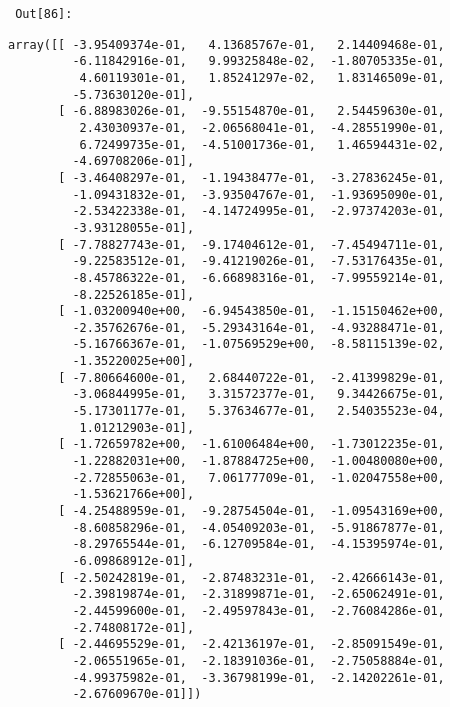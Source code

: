         {\par%
        \vspace{-1\smallerfontscale}%
        \noindent%
        \begin{minipage}{\cellleftmargin}%
    \hfill%
    {\smaller%
    \tt%
    \color{nbframe-out-prompt}%
    Out[86]:}%
    \hspace{\inputpadding}%
    \hspace{0em}%
    \hspace{3pt}%
    \end{minipage}%
        }%
    \begin{addmargin}[\cellleftmargin]{0em}%
    {\smaller%
    \vspace{-1\smallerfontscale}%
    
    
    
    \begin{verbatim}
array([[ -3.95409374e-01,   4.13685767e-01,   2.14409468e-01,
         -6.11842916e-01,   9.99325848e-02,  -1.80705335e-01,
          4.60119301e-01,   1.85241297e-02,   1.83146509e-01,
         -5.73630120e-01],
       [ -6.88983026e-01,  -9.55154870e-01,   2.54459630e-01,
          2.43030937e-01,  -2.06568041e-01,  -4.28551990e-01,
          6.72499735e-01,  -4.51001736e-01,   1.46594431e-02,
         -4.69708206e-01],
       [ -3.46408297e-01,  -1.19438477e-01,  -3.27836245e-01,
         -1.09431832e-01,  -3.93504767e-01,  -1.93695090e-01,
         -2.53422338e-01,  -4.14724995e-01,  -2.97374203e-01,
         -3.93128055e-01],
       [ -7.78827743e-01,  -9.17404612e-01,  -7.45494711e-01,
         -9.22583512e-01,  -9.41219026e-01,  -7.53176435e-01,
         -8.45786322e-01,  -6.66898316e-01,  -7.99559214e-01,
         -8.22526185e-01],
       [ -1.03200940e+00,  -6.94543850e-01,  -1.15150462e+00,
         -2.35762676e-01,  -5.29343164e-01,  -4.93288471e-01,
         -5.16766367e-01,  -1.07569529e+00,  -8.58115139e-02,
         -1.35220025e+00],
       [ -7.80664600e-01,   2.68440722e-01,  -2.41399829e-01,
         -3.06844995e-01,   3.31572377e-01,   9.34426675e-01,
         -5.17301177e-01,   5.37634677e-01,   2.54035523e-04,
          1.01212903e-01],
       [ -1.72659782e+00,  -1.61006484e+00,  -1.73012235e-01,
         -1.22882031e+00,  -1.87884725e+00,  -1.00480080e+00,
         -2.72855063e-01,   7.06177709e-01,  -1.02047558e+00,
         -1.53621766e+00],
       [ -4.25488959e-01,  -9.28754504e-01,  -1.09543169e+00,
         -8.60858296e-01,  -4.05409203e-01,  -5.91867877e-01,
         -8.29765544e-01,  -6.12709584e-01,  -4.15395974e-01,
         -6.09868912e-01],
       [ -2.50242819e-01,  -2.87483231e-01,  -2.42666143e-01,
         -2.39819874e-01,  -2.31899871e-01,  -2.65062491e-01,
         -2.44599600e-01,  -2.49597843e-01,  -2.76084286e-01,
         -2.74808172e-01],
       [ -2.44695529e-01,  -2.42136197e-01,  -2.85091549e-01,
         -2.06551965e-01,  -2.18391036e-01,  -2.75058884e-01,
         -4.99375982e-01,  -3.36798199e-01,  -2.14202261e-01,
         -2.67609670e-01]])
    \end{verbatim}

    
}%
    \end{addmargin}%

